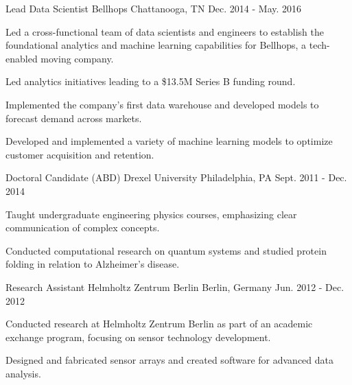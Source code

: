 \begin{cventries}
  \cventry
    {Lead Data Scientist} %
    {Bellhops} %
    {Chattanooga, TN} %
    {Dec. 2014 - May. 2016} %
    {
      \begin{cvitems} %
        \item {Led a cross-functional team of data scientists and engineers to establish the foundational analytics and machine learning capabilities for Bellhops, a tech-enabled moving company.}
        \item {Led analytics initiatives leading to a \$13.5M Series B funding round.}
        \item {Implemented the company’s first data warehouse and developed models to forecast demand across markets.}
        \item {Developed and implemented a variety of machine learning models to optimize customer acquisition and retention.}
      \end{cvitems}
    }

  \cventry
    {Doctoral Candidate (ABD)} %
    {Drexel University} %
    {Philadelphia, PA} %
    {Sept. 2011 - Dec. 2014} %
    {
      \begin{cvitems} %
        \item {Taught undergraduate engineering physics courses, emphasizing clear communication of complex concepts.}
        \item {Conducted computational research on quantum systems and studied protein folding in relation to Alzheimer’s disease.}
      \end{cvitems}
    }

  \cventry
    {Research Assistant} %
    {Helmholtz Zentrum Berlin} %
    {Berlin, Germany} %
    {Jun. 2012 - Dec. 2012} %
    {
      \begin{cvitems} %
        \item {Conducted research at Helmholtz Zentrum Berlin as part of an academic exchange program, focusing on sensor technology development.}
        \item {Designed and fabricated sensor arrays and created software for advanced data analysis.}
      \end{cvitems}
    }


\end{cventries}
